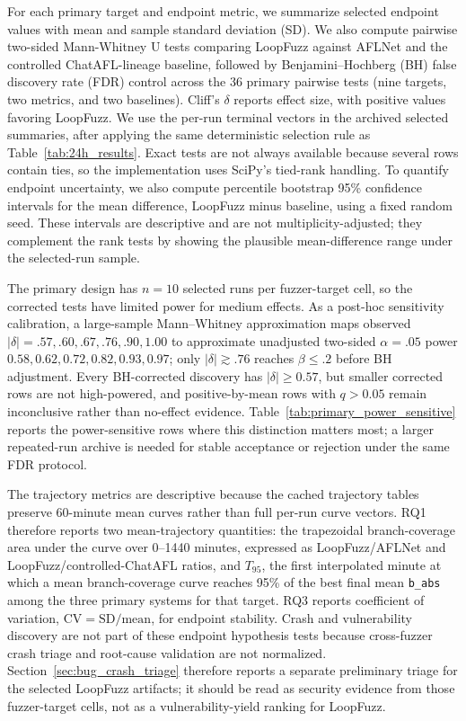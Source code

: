 \documentclass[final,5p,times,number]{elsarticle}
\begin{document}
For each primary target and endpoint metric, we summarize selected endpoint values with mean and sample standard deviation (SD). We also compute pairwise two-sided Mann-Whitney U tests comparing LoopFuzz against AFLNet and the controlled ChatAFL-lineage baseline, followed by Benjamini--Hochberg (BH) false discovery rate (FDR) control across the 36 primary pairwise tests (nine targets, two metrics, and two baselines). Cliff's $\delta$ reports effect size, with positive values favoring LoopFuzz. We use the per-run terminal vectors in the archived selected summaries, after applying the same deterministic selection rule as Table~\ref{tab:24h_results}. Exact tests are not always available because several rows contain ties, so the implementation uses SciPy's tied-rank handling. To quantify endpoint uncertainty, we also compute percentile bootstrap 95\% confidence intervals for the mean difference, LoopFuzz minus baseline, using a fixed random seed. These intervals are descriptive and are not multiplicity-adjusted; they complement the rank tests by showing the plausible mean-difference range under the selected-run sample.

The primary design has $n=10$ selected runs per fuzzer-target cell, so the corrected tests have limited power for medium effects. As a post-hoc sensitivity calibration, a large-sample Mann--Whitney approximation maps observed $|\delta|=.57,.60,.67,.76,.90,1.00$ to approximate unadjusted two-sided $\alpha=.05$ power $0.58,0.62,0.72,0.82,0.93,0.97$; only $|\delta|\gtrsim.76$ reaches $\beta\le.2$ before BH adjustment. Every BH-corrected discovery has $|\delta|\ge0.57$, but smaller corrected rows are not high-powered, and positive-by-mean rows with $q>0.05$ remain inconclusive rather than no-effect evidence. Table~\ref{tab:primary_power_sensitive} reports the power-sensitive rows where this distinction matters most; a larger repeated-run archive is needed for stable acceptance or rejection under the same FDR protocol.

The trajectory metrics are descriptive because the cached trajectory tables preserve 60-minute mean curves rather than full per-run curve vectors. RQ1 therefore reports two mean-trajectory quantities: the trapezoidal branch-coverage area under the curve over 0--1440 minutes, expressed as LoopFuzz/AFLNet and LoopFuzz/controlled-ChatAFL ratios, and $T_{95}$, the first interpolated minute at which a mean branch-coverage curve reaches 95\% of the best final mean \texttt{b\_abs} among the three primary systems for that target. RQ3 reports coefficient of variation, $\mathrm{CV}=\mathrm{SD}/\mathrm{mean}$, for endpoint stability. Crash and vulnerability discovery are not part of these endpoint hypothesis tests because cross-fuzzer crash triage and root-cause validation are not normalized. Section~\ref{sec:bug_crash_triage} therefore reports a separate preliminary triage for the selected LoopFuzz artifacts; it should be read as security evidence from those fuzzer-target cells, not as a vulnerability-yield ranking for LoopFuzz.
\end{document}
